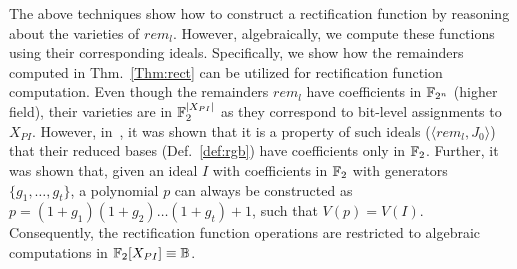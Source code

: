 The above techniques show how to construct a rectification function
by reasoning about the varieties of $rem_l$.  
However, algebraically, we compute these functions using their corresponding ideals.
Specifically, we show how the remainders computed in Thm.~\ref{Thm:rect} can be utilized for rectification function computation.
Even though the remainders $rem_l$ have coefficients in ${\mathbb{F}}_{2^n}$ (higher field), their varieties 
are in ${\mathbb{F}}_{2}^{|X_{PI}|}$ as they correspond to bit-level assignments to $X_{PI}$. However, in~\cite{Utkarsh:VLSI18}, it was 
shown that it is a property of such ideals ($\langle rem_l, J_0 \rangle$) that their reduced
\Grobner bases (Def.~\ref{def:rgb}) have coefficients only in ${\mathbb{F}}_{2}$.
Further, it was shown that, given an ideal $I$ with coefficients in ${\mathbb{F}}_{2}$ with generators  $\{g_1,\dots,g_t\}$, 
a polynomial $p$ can always be constructed as $p = (1+g_1)(1+g_2)\dots(1+g_t)+1$, such that $V(p) = V(I)$. 
Consequently, the rectification function operations are restricted to
algebraic computations in ${\mathbb{F}}_2[X_{PI}]\equiv {\mathbb{B}}$. 

